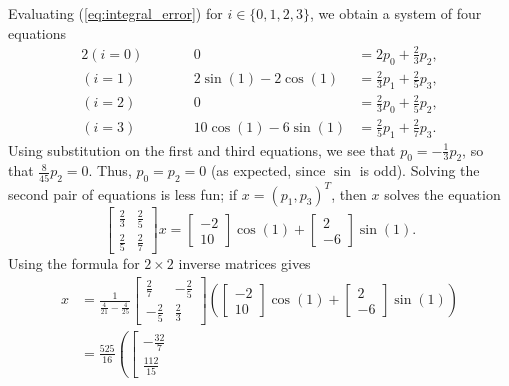 \documentclass{homework}
\begin{document}
\begin{alphaparts}
		Evaluating (\ref{eq:integral_error}) for $i \in \{0,1,2,3\}$, we obtain a system of four equations
		\begin{alignat}{2}
			(i=0)&& \qquad 0 &= 2p_0+ \frac{2}{3}p_2, \\
			(i=1)&& \qquad 2\sin(1)-2\cos(1) &= \frac{2}{3}p_1 + \frac{2}{5}p_3, \\
			(i=2)&& \qquad 0 &= \frac{2}{3}p_0 + \frac{2}{5}p_2, \\
			(i=3)&& \qquad 10\cos(1) -6\sin(1) &= \frac{2}{5}p_1 + \frac{2}{7}p_3.
		\end{alignat}
		Using substitution on the first and third equations, we see that $p_0 = -\frac{1}{3}p_2$, so that $\frac{8}{45}p_2 = 0$. Thus, $p_0 = p_2 = 0$ (as expected, since $\sin$ is odd). Solving the second pair of equations is less fun; if $x = (p_1, p_3)^T$, then $x$ solves the equation
		\begin{equation}
			\left[\begin{matrix}
				\frac{2}{3} & \frac{2}{5} \\[0.5em]
				\frac{2}{5} & \frac{2}{7}
			\end{matrix}\right] x = \left[\begin{matrix}
				-2 \\
				10
			\end{matrix}\right]\cos(1) + \left[\begin{matrix}
			2 \\
			-6
		\end{matrix}\right]\sin(1).
		\end{equation}
		Using the formula for $2\times 2$ inverse matrices gives
		\begin{align}
			x &= \frac{1}{\frac{4}{21} - \frac{4}{25}}\left[\begin{matrix}
				\frac{2}{7} & -\frac{2}{5} \\[0.5em]
				-\frac{2}{5} & \frac{2}{3}
			\end{matrix}\right]\left(\left[\begin{matrix}
				-2 \\
				10
			\end{matrix}\right]\cos(1) + \left[\begin{matrix}
				2 \\
				-6
			\end{matrix}\right]\sin(1)\right) \\[0.5em]
			&= \frac{525}{16}\left(\left[\begin{matrix}
				-\frac{32}{7} \\[0.5em]
				\frac{112}{15}

\end{matrix}
\end{align}
\end{alphaparts}
\end{document}
